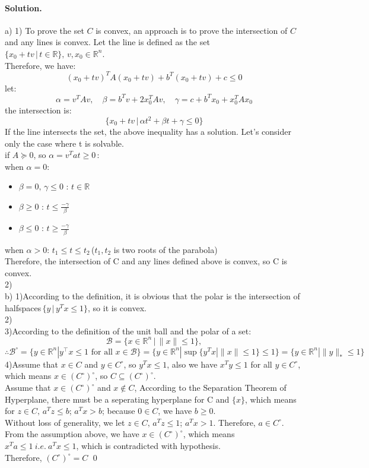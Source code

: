 \documentclass[a4paper]{article}
\newenvironment{solution}
{\color{blue} \paragraph{Solution.}}
{\newline \qed}
\begin{document}
\begin{solution}
    a) 1) To prove the set $C$ is convex, an approach is to prove the intersection of $C$ and any lines is convex. Let the line is defined as the set $\{x_0 + tv\,|\,t \in \mathbb{R}\},\,v,x_0 \in \mathbb{R}^n$.\\Therefore, we have:
    $$(x_0+tv)^TA(x_0+tv)+b^T(x_0+tv)+c \leq 0$$
let: $$\alpha=v^TAv,\quad\beta=b^Tv+2x_0^TAv,\quad\gamma=c+b^Tx_0+x_0^TAx_0$$
the intersection is: $$\{x_0+tv\,|\,\alpha t^2+\beta t+\gamma \leq 0\}$$ 
If the line intersects the set, the above inequality has a solution. Let's consider only the case where t is solvable.\\
if $A \succeq 0$, so $\alpha=v^Tat \geq 0$\,:\\
when $\alpha = 0$:
\begin{itemize}
    \item $\beta = 0,\,\gamma \leq 0$ : $t \in \mathbb{R}$
    \item $\beta \geq 0$ :  $t \leq \frac{-\gamma}{\beta}$
    \item $\beta \leq 0$ :  $t \geq	 \frac{-\gamma}{\beta}$
\end{itemize}
when $\alpha>0$:  $t_1 \leq t  \leq t_2$\,($t_1,t_2$ is two roots of the parabola)\\
Therefore, the intersection of C and any lines defined above is convex, so C is convex.\\
2)\\
b) 1)According to the definition, it is obvious that the polar is the intersection of halfspaces\,$\{y\,|\,y^Tx \leq 1\}$, so it is convex.\\
2)\\
3)According to the definition of the unit ball and the polar of a set:
$$\mathcal{B} = \{x \in \mathbb{R}^n\,|\,\|x\|\leq 1 \},$$
$$\therefore\mathcal{B}^\circ = \{ y\in \mathbb{R}^n | y^\top x\leq 1 \text{ for all }x \in \mathcal{B}\}=\{ y\in \mathbb{R}^n |\sup \{y^Tx | \|x\| \leq 1\}\leq 1\}=\{  y\in \mathbb{R}^n | \|y\|_* \leq 1\}$$
4)Assume that $x \in C$ and $y \in C^\circ$, so $y^Tx \leq 1$, also we have $x^Ty \leq 1$ for all $y \in C^\circ$, which means $x \in (C^\circ)^\circ$, so $C \subseteq (C^\circ)^\circ$.\\
Assume that $x \in (C^\circ)^\circ$ and $x \not\in C$, According to the Separation Theorem of Hyperplane, there must be a seperating hyperplane for C and $\{x\}$, which means for $z \in C,\,a^Tz \leq b$; $a^Tx > b$; because $0 \in C$, we have $b \geq 0$.\\
Without loss of generality, we let  $z \in C,\,a^Tz \leq 1$; $a^Tx > 1$. Therefore, $a \in C^\circ$. From the assumption above, we have $x \in (C^\circ)^\circ$, which means $x^Ta \leq 1\ i.e.\ a^Tx \leq 1$, which is contradicted with hypothesis.\\ Therefore,  $(C^\circ)^\circ = C$
\end{solution}
\end{document}
